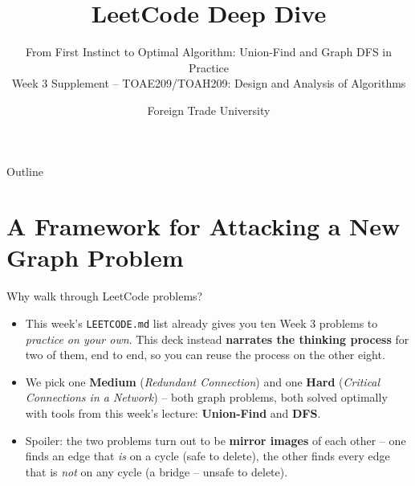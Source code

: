 \documentclass[11pt,aspectratio=169]{beamer}
\title{LeetCode Deep Dive}
\subtitle{From First Instinct to Optimal Algorithm: Union-Find and Graph DFS in Practice\\
\small Week 3 Supplement -- TOAE209/TOAH209: Design and Analysis of Algorithms}
\author{Foreign Trade University}
\date{}
\begin{document}
\begin{frame}
  \titlepage
\end{frame}

\begin{frame}{Outline}
  \tableofcontents
\end{frame}

\section{A Framework for Attacking a New Graph Problem}

\begin{frame}{Why walk through LeetCode problems?}
  \begin{itemize}
    \item This week's \texttt{LEETCODE.md} list already gives you ten Week 3 problems to
    \emph{practice on your own}. This deck instead \textbf{narrates the thinking process}
    for two of them, end to end, so you can reuse the process on the other eight.
    \item We pick one \textcolor{blue!50!black}{\textbf{Medium}} (\emph{Redundant
    Connection}) and one \textcolor{red!60!black}{\textbf{Hard}} (\emph{Critical
    Connections in a Network}) -- both graph problems, both solved optimally with tools
    from this week's lecture: \textbf{Union-Find} and \textbf{DFS}.
    \item Spoiler: the two problems turn out to be \textbf{mirror images} of each other --
    one finds an edge that \emph{is} on a cycle (safe to delete), the other finds every
    edge that is \emph{not} on any cycle (a bridge -- unsafe to delete).
  \end{itemize}
\end{frame}
\end{document}
